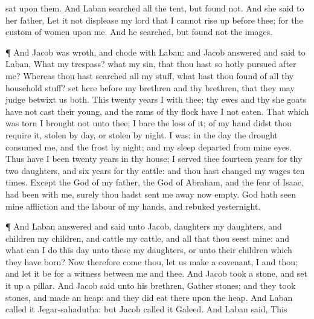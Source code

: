 {sat upon them. And
Laban
searched all the
tent, but
found
{} not.
And she
said to her
father, Let it not
displease my
lord that I
cannot rise
up before
thee; for the
custom of
women
{} upon me. And he
searched, but
found not the
images.
\par }{\PP {}¶ And
Jacob was
wroth, and
chode with
Laban: and
Jacob
answered and
said to
Laban, What
{} my
trespass? what
{} my
sin, that thou hast so hotly
pursued after
me?
Whereas thou hast
searched all my
stuff, what hast thou
found of all thy
household
stuff?
set
{}
here before my
brethren and thy
brethren, that they may
judge
betwixt us
both.
This
twenty
years
{} I
{} with thee; thy
ewes and thy she
goats have not cast their
young, and the
rams of thy
flock have I not
eaten.
That which was
torn
{} I
brought not unto thee; I bare the
loss of it; of my
hand didst thou
require it,
{}
stolen by
day, or
stolen by
night.
 I was; in the
day the
drought
consumed me, and the
frost by
night; and my
sleep
departed from mine
eyes.
Thus have I been
twenty
years in thy
house; I served
thee
fourteen
years for thy
two
daughters, and
six
years for thy
cattle: and thou hast
changed my
wages
ten
times.
Except the
God of my
father, the
God of
Abraham, and the
fear of
Isaac, had been with me, surely thou hadst sent me
away now
empty.
God hath
seen mine
affliction and the
labour of my
hands, and
rebuked
{}
yesternight.
\par }{\PP {}¶ And
Laban
answered and
said unto
Jacob,
{}
daughters
{} my
daughters, and
{}
children
{} my
children, and
{}
cattle
{} my
cattle, and all that thou
seest
{} mine: and what can I
do this
day unto these my
daughters,
or unto their
children which they have
born?
Now therefore come
thou, let us
make a
covenant, I and thou; and let it be for a
witness between me and thee.
And
Jacob
took a
stone, and set it
up
{} a
pillar.
And
Jacob
said unto his
brethren,
Gather
stones; and they
took
stones, and
made an
heap: and they did
eat there upon the
heap.
And
Laban
called it
Jegar-sahadutha: but
Jacob
called it
Galeed.
And
Laban
said, This
}
